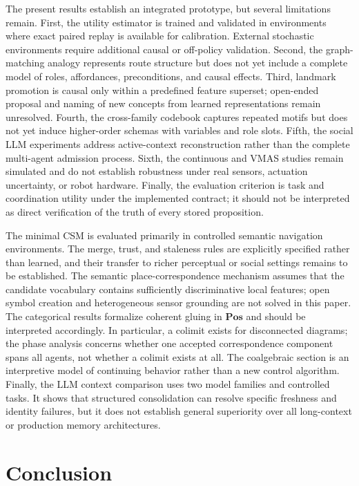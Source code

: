 \documentclass{article}
\begin{document}
The present results establish an integrated prototype, but several
limitations remain. First, the utility estimator is trained and
validated in environments where exact paired replay is available for
calibration. External stochastic environments require additional
causal or off-policy validation. Second, the graph-matching analogy
represents route structure but does not yet include a complete model
of roles, affordances, preconditions, and causal effects. Third,
landmark promotion is causal only within a predefined feature
superset; open-ended proposal and naming of new concepts from learned
representations remain unresolved. Fourth, the cross-family codebook
captures repeated motifs but does not yet induce higher-order schemas
with variables and role slots. Fifth, the social LLM experiments
address active-context reconstruction rather than the complete
multi-agent admission process. Sixth, the continuous and VMAS studies
remain simulated and do not establish robustness under real sensors,
actuation uncertainty, or robot hardware. Finally, the evaluation
criterion is task and coordination utility under the implemented
contract; it should not be interpreted as direct verification of the
truth of every stored proposition.


\label{p4:sec:limits}

The minimal CSM is evaluated primarily in controlled semantic
navigation environments. The merge, trust, and staleness rules are
explicitly specified rather than learned, and their transfer to
richer perceptual or social settings remains to be established. The
semantic place-correspondence mechanism assumes that the candidate
vocabulary contains sufficiently discriminative local features; open
symbol creation and heterogeneous sensor grounding are not solved in
this paper. The categorical results formalize coherent gluing in
$\mathbf{Pos}$ and should be interpreted accordingly. In particular,
a colimit exists for disconnected diagrams; the phase analysis
concerns whether one accepted correspondence component spans all
agents, not whether a colimit exists at all. The coalgebraic section is
an interpretive model of continuing behavior rather than a new
control algorithm. Finally, the LLM context comparison uses two model
families and controlled tasks. It shows that structured consolidation
can resolve specific freshness and identity failures, but it does not
establish general superiority over all long-context or production
memory architectures.


\section{Conclusion}
\end{document}
